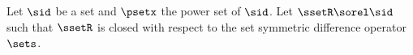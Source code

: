 \begin{proposition}
\label{prop:ss_sets_group}
Let $\sid$ be a set and $\psetx$ the power set of $\sid$.
Let $\ssetR\sorel\sid$ such that $\ssetR$ is closed with respect to the
set symmetric difference operator $\sets$.
\end{proposition}
